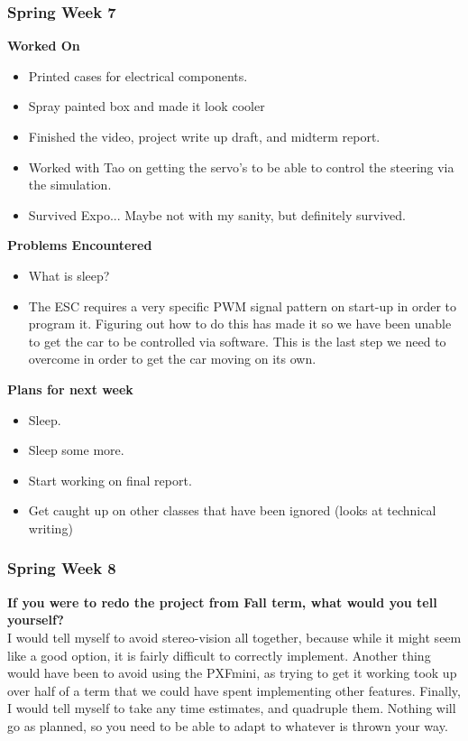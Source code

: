\documentclass[compsoc,draftclsnofoot,onecolumn,10pt]{IEEEtran}
\begin{document}
\subsubsection*{Spring Week 7}
\textbf{Worked On}
\begin{itemize}
    \item Printed cases for electrical components.
    \item Spray painted box and made it look cooler
    \item Finished the video, project write up draft, and midterm report.
    \item Worked with Tao on getting the servo's to be able to control the steering via the simulation.
    \item Survived Expo... Maybe not with my sanity, but definitely survived.
\end{itemize}
\textbf{Problems Encountered}
\begin{itemize}
    \item What is sleep?
    \item The ESC requires a very specific PWM signal pattern on start-up in order to program it. 
    Figuring out how to do this has made it so we have been unable to get the car to be controlled via software.
    This is the last step we need to overcome in order to get the car moving on its own. 
\end{itemize}
\textbf{Plans for next week}
\begin{itemize}
    \item Sleep.
    \item Sleep some more. 
    \item Start working on final report.
    \item Get caught up on other classes that have been ignored (looks at technical writing)
\end{itemize}


\subsubsection*{Spring Week 8}
\textbf{If you were to redo the project from Fall term, what would you tell yourself?}\\
I would tell myself to avoid stereo-vision all together, because while it might seem like a good option, it is fairly difficult to correctly implement. 
Another thing would have been to avoid using the PXFmini, as trying to get it working took up over half of a term that we could have spent implementing other features. 
Finally, I would tell myself to take any time estimates, and quadruple them. Nothing will go as planned, so you need to be able to adapt to whatever is thrown your way.
\end{document}
